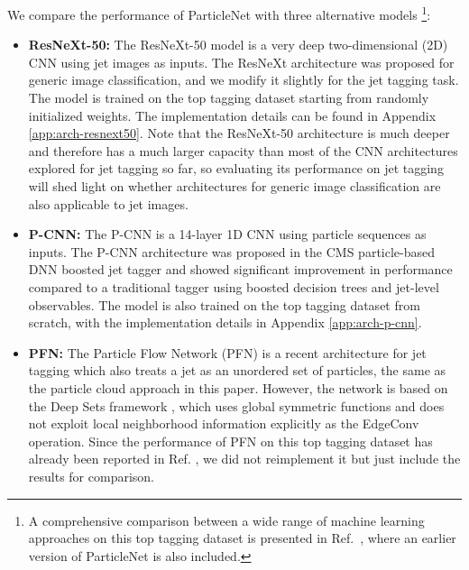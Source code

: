 \documentclass[aps,prd,longbibliography,reprint,amsmath,amssymb,amsfonts]{revtex4-1}
\begin{document}
We compare the performance of ParticleNet with three alternative models \footnote{A comprehensive comparison between a wide range of machine learning approaches on this top tagging dataset is presented in Ref.~\cite{Kasieczka:2019dbj}, where an earlier version of ParticleNet is also included.}:
\begin{itemize}

\item \textbf{ResNeXt-50:} The ResNeXt-50 model is a very deep two-dimensional (2D) CNN using jet images as inputs. The ResNeXt architecture \cite{xie2017aggregated} was proposed for generic image classification, and we modify it slightly for the jet tagging task. The model is trained on the top tagging dataset starting from randomly initialized weights. The implementation details can be found in Appendix \ref{app:arch-resnext50}. Note that the ResNeXt-50 architecture is much deeper and therefore has a much larger capacity than most of the CNN architectures \cite{Cogan:2014oua,deOliveira:2015xxd,Baldi:2016fql,Barnard:2016qma,Dreyer:2018nbf,Kasieczka:2017nvn,Macaluso:2018tck,Komiske:2016rsd,ATL-PHYS-PUB-2017-017,Choi:2018dag} explored for jet tagging so far, so evaluating its performance on jet tagging will shed light on whether architectures for generic image classification are also applicable to jet images.

\item \textbf{P-CNN:} The P-CNN is a 14-layer 1D CNN using particle sequences as inputs. The P-CNN architecture was proposed in the CMS particle-based DNN boosted jet tagger \cite{CMS-DP-2017-049} and showed significant improvement in performance compared to a traditional tagger using boosted decision trees and jet-level observables. The model is also trained on the top tagging dataset from scratch, with the implementation details in Appendix \ref{app:arch-p-cnn}.

\item \textbf{PFN:} The Particle Flow Network (PFN) \cite{Komiske:2018cqr} is a recent architecture for jet tagging which also treats a jet as an unordered set of particles, the same as the particle cloud approach in this paper. However, the network is based on the Deep Sets framework \cite{zaheer2017deep}, which uses global symmetric functions and does not exploit local neighborhood information explicitly as the EdgeConv operation. Since the performance of PFN on this top tagging dataset has already been reported in Ref. \cite{Komiske:2018cqr}, we did not reimplement it but just include the results for comparison.

\end{itemize}
\end{document}
